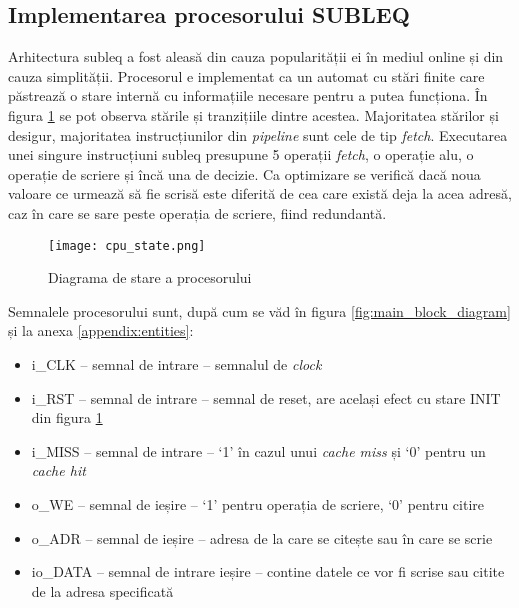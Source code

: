 \documentclass[../main.tex]{subfiles}
\begin{document}
\subsection{Implementarea procesorului SUBLEQ}
Arhitectura \acrshort{subleq} a fost aleasă din cauza popularității ei în mediul online și din cauza simplității.
Procesorul e implementat ca un automat cu stări finite care păstrează o stare internă cu informațiile necesare
pentru a putea funcționa. În figura \ref{fig:cpu_state} se pot observa stările și tranzițiile dintre acestea.
Majoritatea stărilor și desigur, majoritatea instrucțiunilor din \emph{pipeline} sunt cele de tip \emph{fetch}.
Executarea unei singure instrucțiuni \acrshort{subleq} presupune 5 operații \emph{fetch}, o operație \acrshort{alu},
o operație de scriere și încă una de decizie. Ca optimizare se verifică dacă noua valoare ce urmează să fie scrisă
este diferită de cea care există deja la acea adresă, caz în care se sare peste operația de scriere, fiind
redundantă.

\begin{figure}[h]
    \centering
    \texttt{[image: cpu\_state.png]}
    \caption{Diagrama de stare a procesorului}
    \label{fig:cpu_state}
\end{figure}

Semnalele procesorului sunt, după cum se văd în figura \ref{fig:main_block_diagram} și la anexa \ref{appendix:entities}:
\begin{itemize}
    \item i\_CLK -- semnal de intrare -- semnalul de \emph{clock}
    \item i\_RST -- semnal de intrare -- semnal de reset, are același efect cu stare INIT din figura \ref{fig:cpu_state}
    \item i\_MISS -- semnal de intrare -- `1' în cazul unui \emph{cache miss} și `0' pentru un \emph{cache hit}
    \item o\_WE -- semnal de ieșire -- `1' pentru operația de scriere, `0' pentru citire
    \item o\_ADR -- semnal de ieșire -- adresa de la care se citește sau în care se scrie
    \item io\_DATA -- semnal de intrare ieșire -- contine datele ce vor fi scrise sau citite de la adresa specificată
\end{itemize}
\end{document}

